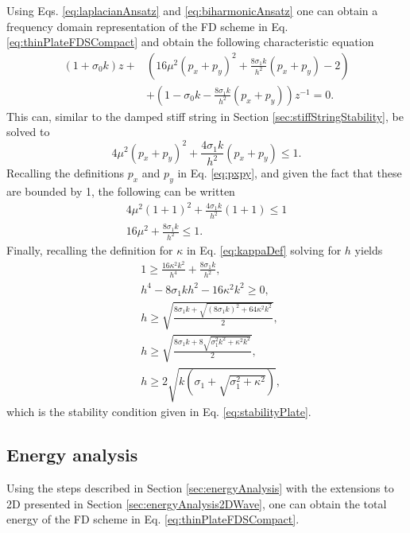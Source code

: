 {Using Eqs. \eqref{eq:laplacianAnsatz} and \eqref{eq:biharmonicAnsatz} one can obtain a frequency domain representation of the FD scheme in Eq. \eqref{eq:thinPlateFDSCompact}
and obtain the following characteristic equation
\begin{equation}
    \begin{aligned}
        (1+\sigma_0k)z + &\left(16\mu^2(p_x+p_y)^2 + \frac{8\sigma_1k}{h^2}(p_x+p_y) - 2\right) \\
        &+ \left(1 - \sigma_0k - \frac{8\sigma_1k}{h^2}(p_x+p_y)\right)z^{-1} = 0.
    \end{aligned}
\end{equation}
This can, similar to the damped stiff string in Section \ref{sec:stiffStringStability}, be solved to
\begin{equation*}
    4\mu^2(p_x+p_y)^2 + \frac{4\sigma_1k}{h^2}(p_x+p_y) \leq 1.
\end{equation*}
Recalling the definitions $p_x$ and $p_y$ in Eq. \eqref{eq:pxpy}, and given the fact that these are bounded by 1, the following can be written
\begin{gather*}
    4\mu^2(1+1)^2 + \frac{4\sigma_1k}{h^2}(1+1) \leq 1\\
    16\mu^2 + \frac{8\sigma_1k}{h^2} \leq 1.
\end{gather*}
Finally, recalling the definition for $\kappa$ in Eq. \eqref{eq:kappaDef} solving for $h$ yields
\begin{align}
    &1 \geq \frac{16\kappa^2k^2}{h^4} + \frac{8\sigma_1k}{h^2}\nonumber,\\
    &h^4 - 8\sigma_1kh^2 - 16\kappa^2k^2 \geq 0\nonumber,\\
    &h \geq \sqrt{\frac{8\sigma_1k +\sqrt{(8\sigma_1k)^2 + 64\kappa^2k^2}}{2}}\nonumber,\\
    &h\geq \sqrt{\frac{8\sigma_1k+8\sqrt{\sigma_1^2k^2+\kappa^2k^2}}{2}}\nonumber,\\
    &h \geq 2\sqrt{k\left(\sigma_1 + \sqrt{\sigma_1^2 + \kappa^2}\right)},
\end{align}
which is the stability condition given in Eq. \eqref{eq:stabilityPlate}.

\subsection{Energy analysis}
Using the steps described in Section \ref{sec:energyAnalysis} with the extensions to 2D presented in Section \ref{sec:energyAnalysis2DWave}, one can obtain the total energy of the FD scheme in Eq. \eqref{eq:thinPlateFDSCompact}.
}
